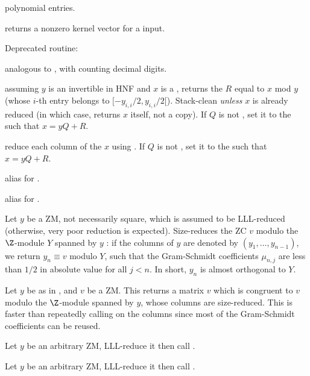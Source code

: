  polynomial entries.

 returns a nonzero kernel vector for a  input.

Deprecated routine:

 analogous to , with
 counting decimal digits.


 assuming $y$ is an
invertible  in HNF and $x$ is a , returns the  $R$
equal to $x$ mod $y$ (whose $i$-th entry belongs to $[-y_{i,i}/2, y_{i,i}/2[$).
Stack-clean \emph{unless} $x$ is already reduced (in which case, returns $x$
itself, not a copy). If $Q$ is not , set it to the  such that
$x = yQ + R$.

 reduce
each column of the  $x$ using . If $Q$ is not
, set it to the  such that $x = yQ + R$.

 alias for .

 alias for .

 Let $y$ be a ZM, not necessarily
square, which is assumed to be LLL-reduced (otherwise, very poor reduction is
expected). Size-reduces the ZC $v$ modulo the $\Z$-module $Y$ spanned by $y$
: if the columns of $y$ are denoted by $(y_1,\dots, y_{n-1})$, we return $y_n
\equiv v$ modulo $Y$, such that the Gram-Schmidt coefficients $\mu_{n,j}$ are
less than $1/2$ in absolute value for all $j < n$. In short, $y_n$ is almost
orthogonal to $Y$.

 Let $y$ be as in
, and $v$ be a ZM. This returns a matrix $v$ which is
congruent to $v$ modulo the $\Z$-module spanned by $y$, whose columns are
size-reduced. This is faster than repeatedly calling 
on the columns since most of the Gram-Schmidt coefficients can be reused.

 Let $y$ be an arbitrary ZM,
LLL-reduce it then call .

 Let $y$ be an arbitrary ZM,
LLL-reduce it then call .

